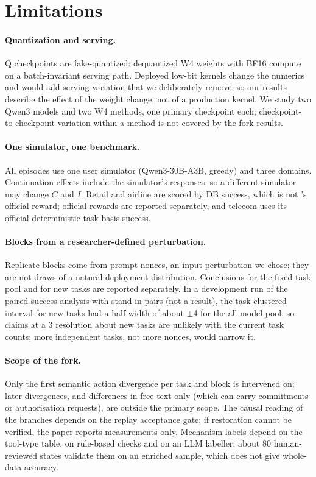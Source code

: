 \section*{Limitations}

\paragraph{Quantization and serving.} Q checkpoints are fake-quantized: dequantized W4 weights with BF16 compute on a batch-invariant serving path. Deployed low-bit kernels change the numerics and would add serving variation that we deliberately remove, so our results describe the effect of the weight change, not of a production kernel. We study two Qwen3 models and two W4 methods, one primary checkpoint each; checkpoint-to-checkpoint variation within a method is not covered by the fork results.

\paragraph{One simulator, one benchmark.} All episodes use one \tautwo{} user simulator (Qwen3-30B-A3B, greedy) and three \tautwo{} domains. Continuation effects include the simulator's responses, so a different simulator may change $C$ and $I$. Retail and airline are scored by DB success, which is not \tautwo{}'s official reward; official rewards are reported separately, and telecom uses its official deterministic task-basis success.

\paragraph{Blocks from a researcher-defined perturbation.} Replicate blocks come from prompt nonces, an input perturbation we chose; they are not draws of a natural deployment distribution. Conclusions for the fixed task pool and for new tasks are reported separately. In a development run of the paired success analysis with stand-in pairs (not a result), the task-clustered interval for new tasks had a half-width of about $\pm$4\pp{} for the all-model pool, so claims at a 3\pp{} resolution about new tasks are unlikely with the current task counts; more independent tasks, not more nonces, would narrow it.

\paragraph{Scope of the fork.} Only the first semantic action divergence per task and block is intervened on; later divergences, and differences in free text only (which can carry commitments or authorisation requests), are outside the primary scope. The causal reading of the branches depends on the replay acceptance gate; if restoration cannot be verified, the paper reports measurements only. Mechanism labels depend on the tool-type table, on rule-based checks and on an LLM labeller; about 80 human-reviewed states validate them on an enriched sample, which does not give whole-data accuracy.

